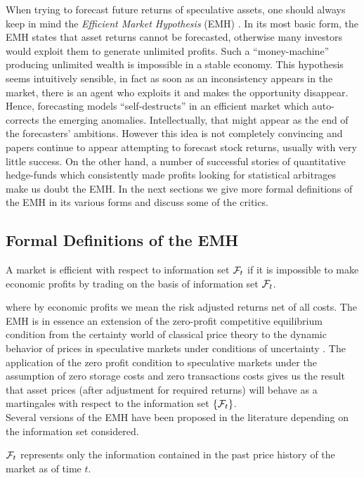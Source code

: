 When trying to forecast future returns of speculative assets, one should always keep in mind the \emph{Efficient Market Hypothesis} (EMH) \cite{timmermann2004efficient}. In its most basic form, the EMH states that asset returns cannot be forecasted, otherwise many investors would exploit them to generate unlimited profits. Such a ``money-machine'' producing unlimited wealth is impossible in a stable economy. This hypothesis seems intuitively sensible, in fact as soon as an inconsistency appears in the market, there is an agent who exploits it and makes the opportunity disappear. Hence, forecasting models ``self-destructs'' in an efficient market which auto-corrects the emerging anomalies. Intellectually, that might appear as the end of the forecasters' ambitions. However this idea is not completely convincing and papers continue to appear attempting to forecast stock returns, usually with very little success. On the other hand, a number of successful stories of quantitative hedge-funds which consistently made profits looking for statistical arbitrages make us doubt the EMH. In the next sections we give more formal definitions of the EMH in its various forms and discuss some of the critics.

\subsection{Formal Definitions of the EMH}
\begin{definition}
	A market is efficient with respect to information set $\mathcal{F}_t$ if it is impossible to make economic profits by trading on the basis of information set $\mathcal{F}_t$.
\end{definition}
where by economic profits we mean the risk adjusted returns net of all costs. The EMH is in essence an extension of the zero-profit competitive equilibrium condition from the certainty world of classical price theory to the dynamic behavior of prices in speculative markets under conditions of uncertainty \cite{jensen1978some}. The application of the zero profit condition to speculative markets under the assumption of zero storage costs and zero transactions costs gives us the result that asset prices (after adjustment for required returns) will behave as a martingales with respect to the information set $\{\mathcal{F}_t\}$.\\
Several versions of the EMH have been proposed in the literature depending on the information set considered.
\begin{definition}
	$\mathcal{F}_t$ represents only the information contained in the past price history of the market as of time $t$. 
\end{definition}

